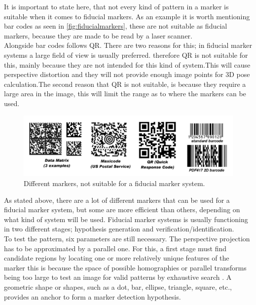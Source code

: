 			It is important to state here, that not every kind of pattern in a marker is suitable when it comes to fiducial markers\cite{fiducialMarkers}. As an example it is worth mentioning bar codes as seen in \autoref{fig:fiducialmarkers}, these are not suitable as fiducial markers, because they are made to be read by a laser scanner.\\
			Alongside bar codes follows QR. There are two reasons for this; in fiducial marker systems a large field of view is usually preferred. therefore QR is not suitable for this, mainly because they are not intended for this kind of system.This will cause perspective distortion and they will not provide enough image points for 3D pose calculation.The second reason that QR is not suitable, is because they require a large area in the image, this will limit the range as to where the markers can be used.\\ 
			
			
			\begin{figure}[H]
				\centering
				\includegraphics[width=0.9\linewidth]{figure/Analysis/fiducialmarkers.png}
				\caption{Different markers, not suitable for a fiducial marker system.}
				\label{fig:fiducialmarkers}
			\end{figure}
			
			
			As stated above, there are a lot of different markers that can be used for a fiducial marker system, but some are more efficient than others, depending on what kind of system will be used.
			Fiducial marker systems is usually functioning in two different stages; hypothesis generation and verification/identification.\\
			
			To test the pattern, six parameters are still necessary. The perspective projection has to be approximated by a parallel one. For this, a first stage must find candidate regions by locating one or more relatively unique features of the marker this is because the space of possible homographies or parallel transforms being too large to test an image for valid patterns by exhaustive search \cite{fiducialMarkers}.
			A geometric shape or shapes, such as a dot, bar, ellipse, triangle, square, etc., provides an anchor to form a marker detection hypothesis.\\
			
